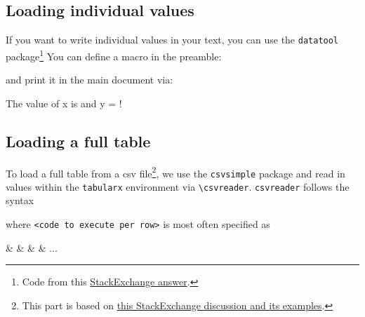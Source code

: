 \documentclass{article}
\begin{document}
\subsection{Loading individual values}
If you want to write individual values in your text, you can use the \verb|datatool| package\footnote{Code from this \href{https://tex.stackexchange.com/questions/524473/latex-get-variables-out-of-a-cvs-row/524474\#524474}{StackExchange answer}.}
You can define a macro in the preamble:
\begin{latexcode}
    \usepackage{datatool}
    \newcommand{\printval}[1]{%
        \DTLfetch%
            {mydata}%
            {value}%
        \xspace%
    }
\end{latexcode}
and print it in the main document via:
\begin{latexcode}
    The value of x is  and y = !
\end{latexcode}

\subsection{Loading a full table}
To load a full table from a csv file\footnote{This part is based on \href{https://tex.stackexchange.com/questions/236274/tabularx-or-tabulary-populated-by-csvsimple}{this StackExchange discussion and its examples}.}, we use the \verb|csvsimple| package and read in values within the \verb|tabularx| environment via \verb|\csvreader|.
\verb|csvreader| follows the syntax 
\begin{latexcode}
\end{latexcode}
where \verb|<code to execute per row>| is most often specified as
\begin{latexcode}
    {\csvcoli & \csvcolii & \csvcoliii & \csvcoliv & ...}
\end{latexcode}
\end{document}
